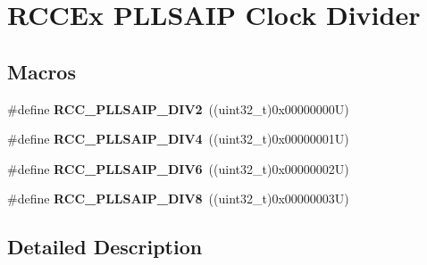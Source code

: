 \hypertarget{group___r_c_c_ex___p_l_l_s_a_i_p___clock___divider}{}\section{R\+C\+C\+Ex P\+L\+L\+S\+A\+IP Clock Divider}
\label{group___r_c_c_ex___p_l_l_s_a_i_p___clock___divider}
\subsection*{Macros}
\begin{DoxyCompactItemize}
\item 
\mbox{\label{group___r_c_c_ex___p_l_l_s_a_i_p___clock___divider_gaf32bded5c13110387b977fb25024d4cf}} 
\#define {\bfseries R\+C\+C\+\_\+\+P\+L\+L\+S\+A\+I\+P\+\_\+\+D\+I\+V2}~((uint32\+\_\+t)0x00000000\+U)
\item 
\mbox{\label{group___r_c_c_ex___p_l_l_s_a_i_p___clock___divider_ga176e48faeb322f27e6b9da22c8e2df1f}} 
\#define {\bfseries R\+C\+C\+\_\+\+P\+L\+L\+S\+A\+I\+P\+\_\+\+D\+I\+V4}~((uint32\+\_\+t)0x00000001\+U)
\item 
\mbox{\label{group___r_c_c_ex___p_l_l_s_a_i_p___clock___divider_ga4387724f1e8b5a239b0de3ad3f9beb38}} 
\#define {\bfseries R\+C\+C\+\_\+\+P\+L\+L\+S\+A\+I\+P\+\_\+\+D\+I\+V6}~((uint32\+\_\+t)0x00000002\+U)
\item 
\mbox{\label{group___r_c_c_ex___p_l_l_s_a_i_p___clock___divider_ga77e54744760b65a5422868294e45f302}} 
\#define {\bfseries R\+C\+C\+\_\+\+P\+L\+L\+S\+A\+I\+P\+\_\+\+D\+I\+V8}~((uint32\+\_\+t)0x00000003\+U)
\end{DoxyCompactItemize}


\subsection{Detailed Description}

